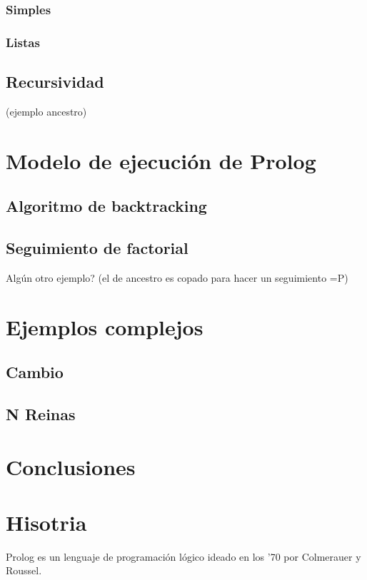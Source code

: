\documentclass[12pt,titlepage]{article}
\begin{document}
\subsubsection{Simples}
\subsubsection{Listas}
\subsection{Recursividad}
(ejemplo ancestro)

\section{Modelo de ejecución de Prolog}
\subsection{Algoritmo de backtracking}
\subsection{Seguimiento de factorial}
    Algún otro ejemplo? (el de ancestro es copado para hacer un seguimiento =P)

\section{Ejemplos complejos}
\subsection{Cambio}
\subsection{N Reinas}

\section{Conclusiones}



\section{Hisotria}
Prolog es un lenguaje de programación lógico ideado en los '70 por Colmerauer y Roussel. \\
\end{document}
